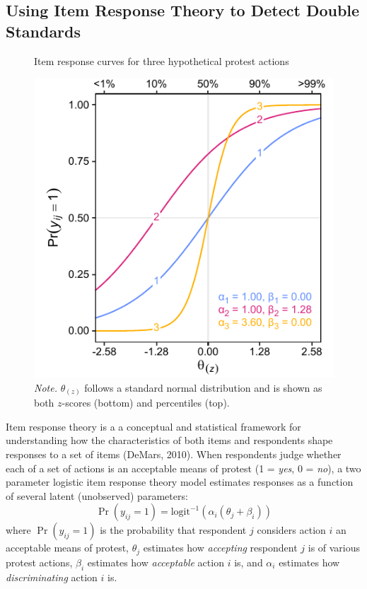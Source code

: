 \documentclass[twocolumn, 11pt, letterpaper]{article}
\begin{document}
\hypertarget{using-item-response-theory-to-detect-double-standards}{%
\subsection{Using Item Response Theory to Detect Double
Standards}\label{using-item-response-theory-to-detect-double-standards}}

\begin{figure}
\centering
\caption{Item response curves for three hypothetical protest actions}
\includegraphics[scale=1]{../Scale Development/figures/figure-1}
\caption*{\textit{Note.} $\theta_{(z)}$ follows a standard normal distribution and is shown as both $z$-scores (bottom) and percentiles (top).}
\label{fig:f1}
\end{figure}

Item response theory is a a conceptual and statistical framework for
understanding how the characteristics of both items and respondents
shape responses to a set of items (DeMars, 2010). When respondents judge
whether each of a set of actions is an acceptable means of protest (1 =
\emph{yes}, 0 = \emph{no}), a two parameter logistic item response
theory model estimates responses as a function of several latent
(unobserved) parameters:
\[ \Pr ( y_{ij} = 1 ) = \text{logit}^{-1} ( \alpha_i ( \theta_j + \beta_i ) ) \]
where \(\Pr ( y_{ij} = 1 )\) is the probability that respondent \(j\)
considers action \(i\) an acceptable means of protest, \(\theta_j\)
estimates how \emph{accepting} respondent \(j\) is of various protest
actions, \(\beta_i\) estimates how \emph{acceptable} action \(i\) is,
and \(\alpha_i\) estimates how \emph{discriminating} action \(i\) is.
\end{document}
